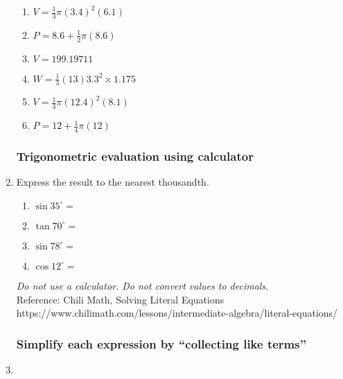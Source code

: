 \begin{enumerate}
\begin{multicols}{2}
\begin{enumerate}
    \item $V=\frac{1}{3} \pi (3.4)^2(6.1)$
    \item $P=8.6 + \frac{1}{2} \pi (8.6)$  
    \item $V=199.19711$
    \item $W=\frac{1}{3} (13)  3.3^2 \times 1.175$
    \item $V=\frac{1}{3} \pi (12.4)^2(8.1)$
    \item $P=12 + \frac{1}{4} \pi (12)$ 
  \end{enumerate}
  \end{multicols}%

  
\subsubsection*{Trigonometric evaluation using calculator}
\item Express the result to the nearest thousandth.  \vspace{1cm}
  \begin{multicols}{2}
    \begin{enumerate}
      \item $\sin 35^\circ = $ %
      \item $\tan 70^\circ =$
      \item $\sin 78^\circ = $ %
      \item $\cos 12^\circ =$
    \end{enumerate}
  \end{multicols} %

  \emph{Do not use a calculator. Do not convert values to decimals.}\\
Reference: Chili Math, Solving Literal Equations \\
https://www.chilimath.com/lessons/intermediate-algebra/literal-equations/

\subsubsection*{Simplify each expression by ``collecting like terms''}
\item 
\begin{enumerate}[itemsep=2cm]
    \end{enumerate} \vspace{0.5cm}
  

\end{enumerate}
